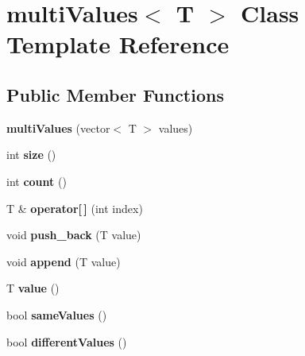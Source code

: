 \hypertarget{classmulti_values}{}\section{multi\+Values$<$ T $>$ Class Template Reference}
\label{classmulti_values}
\subsection*{Public Member Functions}
\begin{DoxyCompactItemize}
\item 
\mbox{\label{classmulti_values_a3686837de9df66065951aea551a5b555}} 
{\bfseries multi\+Values} (vector$<$ T $>$ values)
\item 
\mbox{\label{classmulti_values_a7035f4914a0bc53cd19c63fe76f4c4d6}} 
int {\bfseries size} ()
\item 
\mbox{\label{classmulti_values_a9c5af03aa54b6f9feca30721bb9a463c}} 
int {\bfseries count} ()
\item 
\mbox{\label{classmulti_values_acde91a1c86fd210b30265539e7400e01}} 
T \& {\bfseries operator\mbox{[}$\,$\mbox{]}} (int index)
\item 
\mbox{\label{classmulti_values_a84a672326d65d07d9ca7dd96d5c2d0f2}} 
void {\bfseries push\+\_\+back} (T value)
\item 
\mbox{\label{classmulti_values_aa0e63cbf8f5595a1088f241ace9a7c81}} 
void {\bfseries append} (T value)
\item 
\mbox{\label{classmulti_values_abb41386210668173c19066c1955b9493}} 
T {\bfseries value} ()
\item 
\mbox{\label{classmulti_values_aa5cd8898dc4662a372d611a5265ce10c}} 
bool {\bfseries same\+Values} ()
\item 
\mbox{\label{classmulti_values_a53e20ca4dd3c6a8797cf1cdc2082e9ee}} 
bool {\bfseries different\+Values} ()
\end{DoxyCompactItemize}
